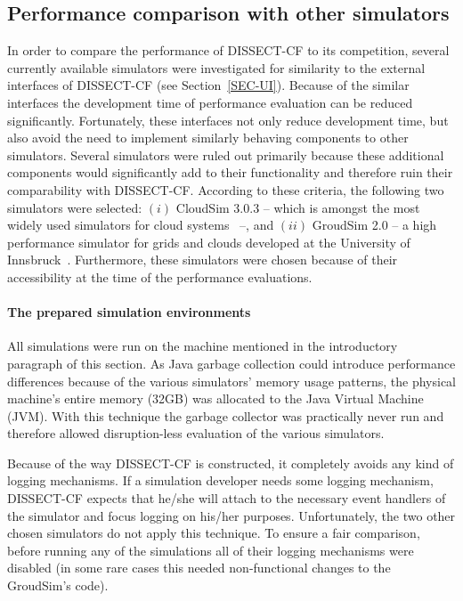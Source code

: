 \documentclass[sort, compress, 5p]{elsarticle}
\begin{document}
\subsection{Performance comparison with other simulators}

In order to compare the performance of DISSECT-CF to its competition, several currently available simulators were investigated for similarity to the external interfaces of DISSECT-CF (see Section~\ref{SEC-UI}). Because of the similar interfaces the development time of performance evaluation can be reduced significantly. Fortunately, these interfaces not only reduce development time, but also avoid the need to implement similarly behaving components to other simulators. Several simulators were ruled out primarily because these additional components would significantly add to their functionality and therefore ruin their comparability with DISSECT-CF. According to these criteria, the following two simulators were selected: $(i)$ CloudSim 3.0.3 -- which is amongst the most widely used simulators for cloud systems~\cite{CloudSim-buyya2009modeling} --, and $(ii)$ GroudSim 2.0 -- a high performance simulator for grids and clouds developed at the University of Innsbruck~\cite{GroudSim-ostermann2011groudsim}. Furthermore, these simulators were chosen because of their accessibility at the time of the performance evaluations.

\paragraph{The prepared simulation environments} All simulations were run on the machine mentioned in the introductory paragraph of this section. As Java garbage collection could introduce performance differences because of the various simulators' memory usage patterns, the physical machine's entire memory (32GB) was allocated to the Java Virtual Machine (JVM). With this technique the garbage collector was practically never run and therefore allowed disruption-less evaluation of the various simulators.

Because of the way DISSECT-CF is constructed, it completely avoids any kind of logging mechanisms. If a simulation developer needs some logging mechanism, DISSECT-CF expects that he/she will attach to the necessary event handlers of the simulator and focus logging on his/her purposes. Unfortunately, the two other chosen simulators do not apply this technique. To ensure a fair comparison, before running any of the simulations all of their logging mechanisms were disabled (in some rare cases this needed non-functional changes to the GroudSim's code).
\end{document}
